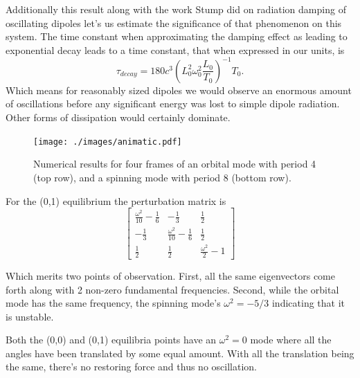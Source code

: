 \documentclass[prbg,preprint]{revtex4-1}
\begin{document}
Additionally this result along with the work Stump did on radiation damping of oscillating dipoles \cite{Stump:1997aa} let's us estimate the significance of that phenomenon on this system. The time constant when approximating the damping effect as leading to exponential decay leads to a time constant, that when expressed in our units, is 
\begin{equation}
\tau_{decay}=180 c^3 \left (L_0^2 \omega_0^2\frac{L_0}{T_0} \right)^{-1}T_0. 
\end{equation}
Which means for reasonably sized dipoles we would observe an enormous amount of oscillations before any significant energy was lost to simple dipole radiation. Other forms of dissipation would certainly dominate.


\begin{figure}[h]
	\texttt{[image: ./images/animatic.pdf]} 

  \caption{Numerical results for  four frames of an orbital mode with period 4 (top row), and a spinning mode with period 8 (bottom row).}
  
\end{figure}

For the (0,1) equilibrium the perturbation matrix is 
\begin{equation}
	\left[\begin{matrix}\frac{\omega^{2}}{10} - \frac{1}{6} & - \frac{1}{3} & \frac{1}{2}\\
	- \frac{1}{3} & \frac{\omega^{2}}{10} - \frac{1}{6} & \frac{1}{2}\\
	\frac{1}{2} & \frac{1}{2} & \frac{\omega^{2}}{2} - 1\end{matrix}\right]\end{equation}

Which merits two points of observation. First, all the same eigenvectors come forth along with 2 non-zero fundamental frequencies. Second, while the orbital mode has the same frequency, the spinning mode's $\omega^2=-5/3$ indicating that it is unstable.

Both the (0,0) and (0,1) equilibria points have an $\omega^2=0$ mode where all the angles have been translated by some equal amount. With all the translation being the same, there's no restoring force and thus no oscillation.
\end{document}
